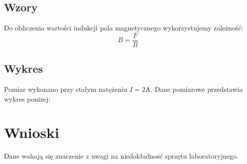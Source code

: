 \documentclass{article} %
\begin{document}
\subsection{Wzory}

Do obliczenia wartości indukcji pola magnetycznego wykorzystujemy zależność:
{\large
\begin{equation}
    B = \frac{F}{Il}
\end{equation}
}

\subsection{Wykres}

Pomiar wykonano przy stałym natężeniu $I = 2$A. 
Dane pomiarowe przedstawia wykres poniżej:

\section{Wnioski}

Dane wahają się znaczenie z uwagi na niedokładność sprzętu laboratoryjnego.
\end{document}
